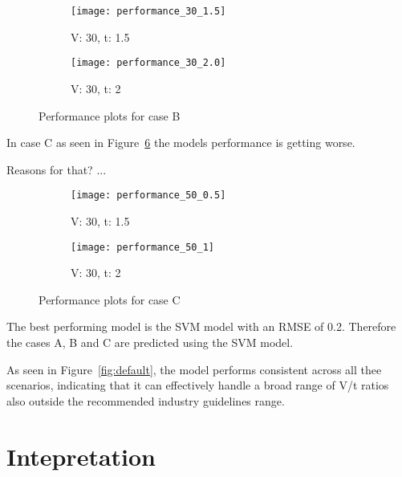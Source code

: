 \begin{figure}[H]
    \begin{tcolorbox}[arc=0pt,boxrule=0.5pt]
        \begin{subfigure}{0.5\textwidth}
            \texttt{[image: performance\_30\_1.5]}
            \caption{V: 30, t: 1.5}
            \label{fig:performance-30_1.5}
        \end{subfigure}
        \hfill
        \begin{subfigure}{0.5\textwidth}
            \texttt{[image: performance\_30\_2.0]}
            \caption{V: 30, t: 2}
            \label{fig:performance-30_2.0}
        \end{subfigure}
    \end{tcolorbox}
    \caption{Performance plots for case B}
    \label{fig:performance-case-b}
\end{figure}

In case C as seen in Figure~\ref{fig:performance-case-c} the models performance is
getting worse.

Reasons for that? ...

\begin{figure}[H]
    \begin{tcolorbox}[arc=0pt,boxrule=0.5pt]
        \begin{subfigure}{0.5\textwidth}
            \texttt{[image: performance\_50\_0.5]}
            \caption{V: 30, t: 1.5}
            \label{fig:performance-30_1.5}
        \end{subfigure}
        \hfill
        \begin{subfigure}{0.5\textwidth}
            \texttt{[image: performance\_50\_1]}
            \caption{V: 30, t: 2}
            \label{fig:performance-30_2.0}
        \end{subfigure}
    \end{tcolorbox}
    \caption{Performance plots for case C}
    \label{fig:performance-case-c}
\end{figure}


The best performing model is the \ac{SVM} model with an \ac{RMSE} of 0.2.
Therefore the cases A, B and C are predicted using the \ac{SVM} model.

As seen in Figure~\ref{fig:default}, the model performs consistent across all thee
scenarios, indicating that it can effectively handle a broad range of V/t ratios also
outside the recommended industry guidelines range.


\section{Intepretation}
